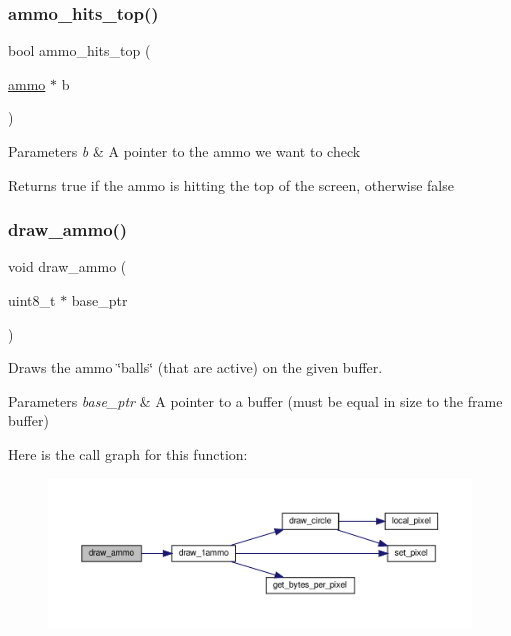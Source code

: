 \subsubsection{\texorpdfstring{ammo\+\_\+hits\+\_\+top()}{ammo\_hits\_top()}}
{\footnotesize\ttfamily bool ammo\+\_\+hits\+\_\+top (\begin{DoxyParamCaption}\item[{\hyperlink{structammo}{ammo} $\ast$}]{b }\end{DoxyParamCaption})}


\begin{DoxyParams}{Parameters}
{\em b} & A pointer to the ammo we want to check \\
\hline
\end{DoxyParams}
\begin{DoxyReturn}{Returns}
true if the ammo is hitting the top of the screen, otherwise false 
\end{DoxyReturn}
\mbox{\label{group__ammo_ga4d649b8b03319d3a2cdc2f171f9112ea}} 
\subsubsection{\texorpdfstring{draw\+\_\+ammo()}{draw\_ammo()}}
{\footnotesize\ttfamily void draw\+\_\+ammo (\begin{DoxyParamCaption}\item[{uint8\+\_\+t $\ast$}]{base\+\_\+ptr }\end{DoxyParamCaption})}



Draws the ammo \char`\"{}balls\char`\"{} (that are active) on the given buffer. 


\begin{DoxyParams}{Parameters}
{\em base\+\_\+ptr} & A pointer to a buffer (must be equal in size to the frame buffer) \\
\hline
\end{DoxyParams}
Here is the call graph for this function\+:\nopagebreak
\begin{figure}[H]
\begin{center}
\leavevmode
\includegraphics[width=350pt]{group__ammo_ga4d649b8b03319d3a2cdc2f171f9112ea_cgraph}
\end{center}
\end{figure}
\mbox{\label{group__ammo_gafd32649160360f67e00c8dc8186edeef}} 

